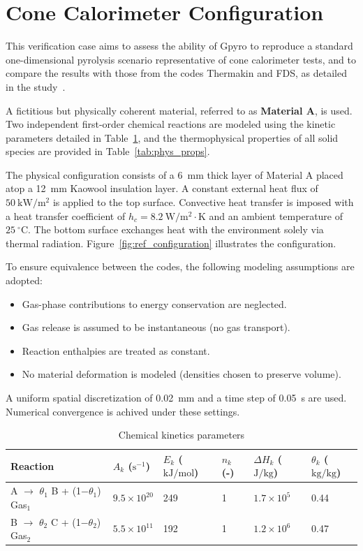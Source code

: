 \documentclass[12pt]{article}
\begin{document}
\fi

\section{Cone Calorimeter Configuration}
\label{sec:ref_cone_calo}
This verification case aims to assess the ability of Gpyro to reproduce a standard one-dimensional pyrolysis scenario representative of cone calorimeter tests, and to compare the results with those from the codes Thermakin and FDS, as detailed in the study~\cite{abdelhafiz2025}.

A fictitious but physically coherent material, referred to as \textbf{Material A}, is used. Two independent first-order chemical reactions are modeled using the kinetic parameters detailed in Table~\ref{tab:chem_props}, and the thermophysical properties of all solid species are provided in Table~\ref{tab:phys_props}.

The physical configuration consists of a 6~mm thick layer of Material A placed atop a 12~mm Kaowool insulation layer. A constant external heat flux of $50~\mathrm{kW/m^2}$ is applied to the top surface. Convective heat transfer is imposed with a heat transfer coefficient of $h_c = 8.2~\mathrm{W/m^2{\cdot}K}$ and an ambient temperature of $25~^\circ\mathrm{C}$. The bottom surface exchanges heat with the environment solely via thermal radiation. Figure~\ref{fig:ref_configuration} illustrates the configuration.

To ensure equivalence between the codes, the following modeling assumptions are adopted:

\begin{itemize}[noitemsep, topsep=0pt]
\item Gas-phase contributions to energy conservation are neglected.
\item Gas release is assumed to be instantaneous (no gas transport).
\item Reaction enthalpies are treated as constant.
\item No material deformation is modeled (densities chosen to preserve volume).
\end{itemize}

\vspace{1em} 

A uniform spatial discretization of 0.02~mm and a time step of 0.05~s are used. Numerical convergence is achived under these settings.

\begin{table}[H]
\centering
\caption{Chemical kinetics parameters}
\label{tab:chem_props}
\begin{tabular}{@{}llllll@{}}
\toprule
Reaction & $A_k$ ($\mathrm{s^{-1}}$) & $E_k$ ($\mathrm{kJ/mol}$) & $n_k$ (-) & $\Delta H_k$ ($\mathrm{J/kg}$) & $\theta_k$ ($\mathrm{kg/kg}$) \\
\midrule
A $\rightarrow$ $\theta_1$ B + (1$-\theta_1$) Gas$_1$ & $9.5 \times 10^{20}$ & 249 & 1 & $1.7 \times 10^5$ & 0.44 \\
B $\rightarrow$ $\theta_2$ C + (1$-\theta_2$) Gas$_2$ & $5.5 \times 10^{11}$ & 192 & 1 & $1.2 \times 10^6$ & 0.47 \\
\bottomrule
\end{tabular}
\end{table}
\end{document}
